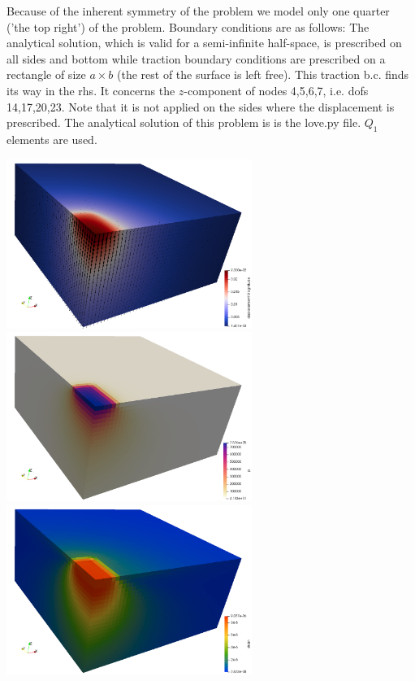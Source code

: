 Because of the inherent symmetry of the problem we model only one quarter ('the top right')
of the problem. Boundary conditions are as follows: The analytical solution,
which is valid for a semi-infinite half-space, is prescribed on 
all sides and bottom while traction boundary conditions are prescribed on a 
rectangle of size $a\times b$ (the rest of the surface is left free).
This traction b.c. finds its way in the rhs. It concerns the $z$-component of
nodes 4,5,6,7, i.e. dofs 14,17,20,23. Note that it is not applied on the sides 
where the displacement is prescribed.
The analytical solution of this problem is is the {\pythonfile love.py} file.
$Q_1$ elements are used. 

\begin{center}
\includegraphics[width=8cm]{python_codes/fieldstone_123/results/exp1/disp} 
\includegraphics[width=8cm]{python_codes/fieldstone_123/results/exp1/press} \\
\includegraphics[width=8cm]{python_codes/fieldstone_123/results/exp1/strain} 

\end{center}
